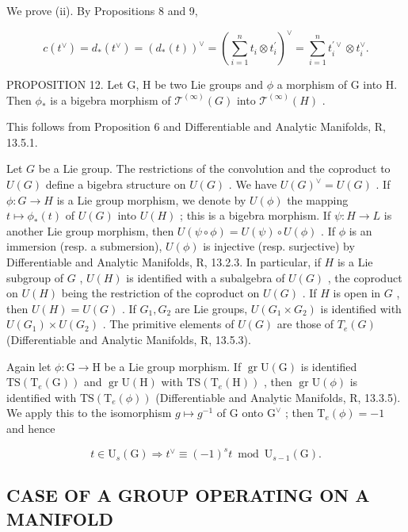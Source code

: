 We prove (ii). By Propositions 8 and 9,

\[
c (t ^ {\vee}) = d _ {*} (t ^ {\vee}) = (d _ {*} (t)) ^ {\vee} = \left(\sum_ {i = 1} ^ {n} t _ {i} \otimes t _ {i} ^ {\prime}\right) ^ {\vee} = \sum_ {i = 1} ^ {n} t _ {i} ^ {\prime \vee} \otimes t _ {i} ^ {\vee}.
\]

PROPOSITION 12. Let G, H be two Lie groups and \(\phi\) a morphism of G into H. Then \(\phi_{*}\) is a bigebra morphism of \(\mathcal{T}^{(\infty)}(G)\) into \(\mathcal{T}^{(\infty)}(H)\) .

This follows from Proposition 6 and Differentiable and Analytic Manifolds, R, 13.5.1.

Let \(G\) be a Lie group. The restrictions of the convolution and the coproduct to \(U(G)\) define a bigebra structure on \(U(G)\) . We have \(U(G)^{\vee} = U(G)\) . If \(\phi: G \to H\) is a Lie group morphism, we denote by \(U(\phi)\) the mapping \(t \mapsto \phi_{*}(t)\) of \(U(G)\) into \(U(H)\) ; this is a bigebra morphism. If \(\psi: H \to L\) is another Lie group morphism, then \(U(\psi \circ \phi) = U(\psi) \circ U(\phi)\) . If \(\phi\) is an immersion (resp. a submersion), \(U(\phi)\) is injective (resp. surjective) by Differentiable and Analytic Manifolds, R, 13.2.3. In particular, if \(H\) is a Lie subgroup of \(G\) , \(U(H)\) is identified with a subalgebra of \(U(G)\) , the coproduct on \(U(H)\) being the restriction of the coproduct on \(U(G)\) . If \(H\) is open in \(G\) , then \(U(H) = U(G)\) . If \(G_1, G_2\) are Lie groups, \(U(G_1 \times G_2)\) is identified with \(U(G_1) \times U(G_2)\) . The primitive elements of \(U(G)\) are those of \(T_e(G)\) (Differentiable and Analytic Manifolds, R, 13.5.3).

Again let \(\phi: \mathrm{G} \to \mathrm{H}\) be a Lie group morphism. If \(\operatorname{gr} \mathrm{U}(\mathrm{G})\) is identified \(\mathrm{TS}(\mathrm{T}_e(\mathrm{G}))\) and \(\operatorname{gr} \mathrm{U}(\mathrm{H})\) with \(\mathrm{TS}(\mathrm{T}_e(\mathrm{H}))\) , then \(\operatorname{gr} \mathrm{U}(\phi)\) is identified with \(\mathrm{TS}(\mathrm{T}_e(\phi))\) (Differentiable and Analytic Manifolds, R, 13.3.5). We apply this to the isomorphism \(g \mapsto g^{-1}\) of \(\mathrm{G}\) onto \(\mathrm{G}^{\vee}\) ; then \(\mathrm{T}_e(\phi) = -1\) and hence

\[
t \in \mathrm{U} _ {s} (\mathrm{G}) \Rightarrow t ^ {\vee} \equiv (- 1) ^ {s} t \bmod \mathrm{U} _ {s - 1} (\mathrm{G}).\tag{3}
\]

\subsection{CASE OF A GROUP OPERATING ON A MANIFOLD}

